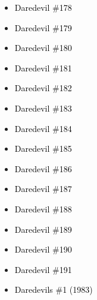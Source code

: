 \documentclass[12pt]{article}
\newcommand{\checkbox}{\raisebox{0.0ex}{\fbox{\rule{0ex}{1.5ex} \rule{1.5ex}{0ex}}}}
\begin{document}
\vspace{0.3cm}
\noindent
\begin{tcolorbox}[
  colback=white!95!gray,
  colframe=black,
  width=\textwidth,
  arc=4mm,
  auto outer arc,
  boxrule=0.8pt,
  left=8pt,right=8pt,top=8pt,bottom=8pt
]
\begin{itemize}[left=0pt,label={\checkbox}]
    \item \textcolor{black}{Daredevil \#178}
    \item \textcolor{black}{Daredevil \#179}
    \item \textcolor{black}{Daredevil \#180}
    \item \textcolor{black}{Daredevil \#181}
    \item \textcolor{black}{Daredevil \#182}
    \item \textcolor{black}{Daredevil \#183}
    \item \textcolor{black}{Daredevil \#184}
    \item \textcolor{black}{Daredevil \#185}
    \item \textcolor{black}{Daredevil \#186}
    \item \textcolor{black}{Daredevil \#187}
    \item \textcolor{black}{Daredevil \#188}
    \item \textcolor{black}{Daredevil \#189}
    \item \textcolor{black}{Daredevil \#190}
    \item \textcolor{black}{Daredevil \#191}
    \item \textcolor{black}{Daredevils \#1 (1983)}
\end{itemize}
\end{tcolorbox}

\newpage
{}
\end{document}
